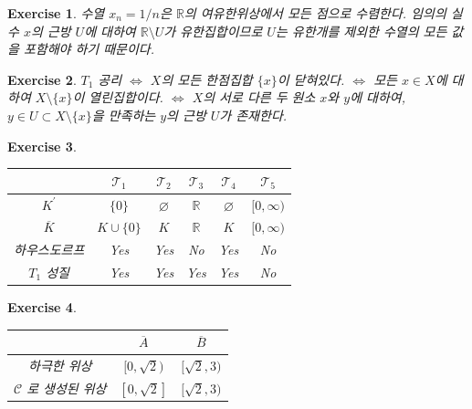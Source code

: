 \documentclass{article}
\newtheorem{exercise}{Exercise}[section]
\newcommand{\R}{\mathbb{R}}
\begin{document}
\begin{exercise}
    수열 $x_n=1/n$은 $\R$의 여유한위상에서 모든 점으로 수렴한다. 임의의 실수 $x$의 근방 $U$에 대하여 $\R\setminus U$가 유한집합이므로 $U$는 유한개를 제외한 수열의 모든 값을 포함해야 하기 때문이다.
\end{exercise}

\begin{exercise}
    $T_1$ 공리 $\Longleftrightarrow$ $X$의 모든 한점집합 $\{x\}$이 닫혀있다. $\Longleftrightarrow$ 모든 $x\in X$에 대하여 $X\setminus\{x\}$이 열린집합이다. $\Longleftrightarrow$ $X$의 서로 다른 두 원소 $x$와 $y$에 대하여, $y\in U\subset X\setminus\{x\}$을 만족하는 $y$의 근방 $U$가 존재한다.
\end{exercise}

\begin{exercise}
    \phantom{()}
    \begin{table}[H]
    	\centering
        \begin{tabular}{c|ccccc}
            \toprule
            & $\mathcal{T}_1$ & $\mathcal{T}_2$ & $\mathcal{T}_3$ & $\mathcal{T}_4$ & $\mathcal{T}_5$ \\
            \midrule
            $K^{\prime}$ & $\{0\}$ & $\varnothing$ & $\R$ & $\varnothing$ & $[0,\infty)$ \\
            \midrule
            $\overline{K}$ & $K\cup\{0\}$ & $K$ & $\R$ & $K$ & $[0,\infty)$  \\
            \midrule
            하우스도르프 & Yes & Yes & No & Yes & No \\
            \midrule
            $T_1$ 성질 & Yes & Yes & Yes & Yes & No \\
            \bottomrule
        \end{tabular} 
    \end{table}
\end{exercise}

\begin{exercise}
    \phantom{}
    \begin{table}[H]
    	\centering
        \begin{tabular}{c|cc}
            \toprule
            & $\overline{A}$ & $\overline{B}$ \\
            \midrule
            하극한 위상 & $[0,\sqrt2)$ & $[\sqrt2,3)$ \\
            \midrule
            $\mathcal{C}$ 로 생성된 위상 & $[0,\sqrt2]$ & $[\sqrt2,3)$ \\
            \midrule
        \end{tabular}
    \end{table}
\end{exercise}
\end{document}
